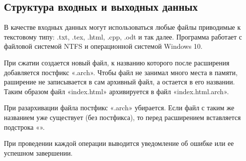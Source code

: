 \subsection{Структура входных и выходных данных}

В качестве входных данных могут использоваться любые файлы приводимые к текстовому типу: .txt, .tex, .html, .cpp, .odt и так далее. 
Программа работает с файловой системой NTFS и операционной системой Windows 10.



При сжатии создается новый файл, к названию которого после расширения добавляется постфикс «.arch».
Чтобы файл не занимал много места в памяти, раширение не записывается в сам архивный файл, а остается в его названии.
Таким образом файл «index.html» архивируется в файл «index.html.arch».



При разархивации файла постфикс «.arch» убирается. 
Если файл с таким же названием уже существует (без постфикса), то перед расширением вставляется подстрока «».



При проведении каждой операции выводится уведомление об ошибке или ее успешном завершении.